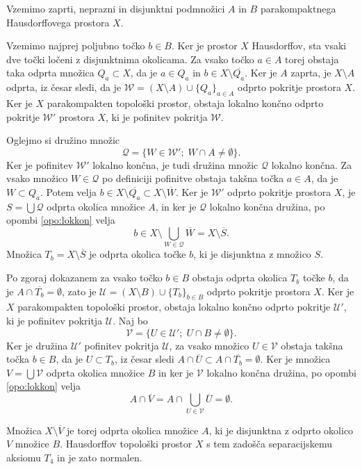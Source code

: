 \documentclass[mat1]{fmfdelo}
\newcommand{\Ucurl}{\mathcal{U}}
\newcommand{\closure}[1]{\overline{#1}}
\begin{document}
\begin{dokaz}
Vzemimo zaprti, neprazni in disjunktni podmnožici $A$ in $B$ parakompaktnega Hausdorff\-o\-ve\-ga prostora $X$.

Vzemimo najprej poljubno točko $b \in B$. Ker je prostor $X$ Hausdorffov, sta vsaki dve točki ločeni z disjunktnima okolicama. Za vsako točko $a \in A$ torej obstaja taka odprta množica $Q_a \subset X$, da je $a \in Q_a$ in $b \in X \setminus \closure{Q_a}$. Ker je $A$ zaprta, je $X \setminus A$ odprta, iz česar sledi, da je $\mathcal{W} = (X \setminus A)\cup \lbrace Q_a\rbrace_{a \in A}$ odprto pokritje prostora $X$. Ker je $X$ parakompakten topološki prostor, obstaja lokalno končno odprto pokritje $\mathcal{W}'$ prostora $X$, ki je pofinitev pokritja $\mathcal{W}$.

Oglejmo si družino množic \[ \mathcal{Q} = \lbrace W \in \mathcal{W}' ;\; W \cap A \neq \emptyset \rbrace. \]
Ker je pofinitev $\mathcal{W}'$ lokalno končna, je tudi družina množic $\mathcal{Q}$ lokalno končna.
Za vsako množico $W \in \mathcal{Q}$ po definiciji pofinitve obstaja takšna točka $a \in A$, da je $W \subset Q_a$.
 Potem velja $b \in X \setminus \closure{Q_a} \subset X \setminus \closure{W}$. Ker je $\mathcal{W}'$ odprto pokritje prostora $X$, je $S = \bigcup\mathcal{Q}$ odprta okolica množice $A$, in ker je $\mathcal{Q}$ lokalno končna družina, po opombi \ref{opo:lokkon} velja \[ b \in X \setminus \bigcup_{W \in \mathcal{Q}} \closure{W} = X \setminus \closure{S}. \] Množica $T_b = X \setminus \closure{S}$ je odprta okolica točke $b$, ki je disjunktna z množico $S$.

Po zgoraj dokazanem za vsako točko $b \in B$ obstaja odprta okolica $T_b$ točke $b$, da je $A \cap \closure{T_b} = \emptyset$, zato je $\Ucurl = (X\setminus B) \cup \lbrace T_b \rbrace_{b \in B}$ odprto pokritje prostora $X$. Ker je $X$ parakompakten topološki prostor, obstaja lokalno končno odprto pokritje $\Ucurl'$, ki je pofinitev pokritja $\Ucurl$. Naj bo \[ \mathcal{V} = \lbrace U \in \Ucurl' ;\; U \cap B \neq \emptyset \rbrace. \]
Ker je družina $\Ucurl'$ pofinitev pokritja $\Ucurl$, za vsako množico $U \in \mathcal{V}$ obstaja takšna točka $b \in B$, da je $U \subset T_b$, iz česar sledi $A \cap \closure{U} \subset A \cap \closure{T_b} = \emptyset$. Ker je množica $V = \bigcup \mathcal{V}$ odprta okolica množice $B$ in ker je $\mathcal{V}$ lokalno končna družina, po opombi \ref{opo:lokkon} velja \[ A \cap \closure{V} = A \cap \bigcup_{U \in \mathcal{V}}\closure{U} = \emptyset.\]

Množica $X \setminus \closure{V}$ je torej odprta okolica množice $A$, ki je disjunktna z odprto okolico $V$ množice $B$. Hausdorffov topološki prostor $X$ s tem zadošča separacijskemu aksiomu $T_4$ in je zato normalen.
\end{dokaz}
\end{document}
